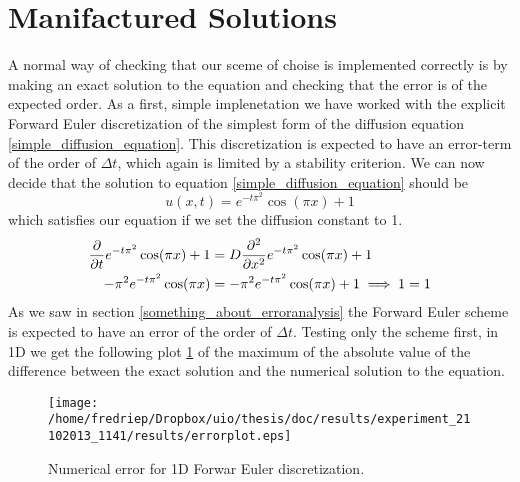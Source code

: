 \section{Manifactured Solutions}
A normal way of checking that our sceme of choise is implemented correctly is by making an exact solution to the equation and checking that the error is of the expected order. 
As a first, simple implenetation we have worked with the explicit Forward Euler discretization of the simplest form of the diffusion equation \hyperref[simple_diffusion_equation]{\ref*{simple_diffusion_equation}}. 
This discretization is expected to have an error-term of the order of $\Delta t$, which again is limited by a stability criterion. 
We can now decide that the solution to equation \ref{simple_diffusion_equation} should be
\begin{equation}\label{manifactured_solution_1D}
 u(x,t) = e^{-t\pi^2}\cos(\pi x) +1
\end{equation}
which satisfies our equation if we set the diffusion constant to 1.
\begin{align}
 \frac{\partial }{\partial t}e^{-t\pi^2}\cos(\pi x) +1 &= D\frac{\partial^2}{\partial x^2}e^{-t\pi^2}\cos(\pi x) +1\\
 -\pi^2e^{-t\pi^2}\cos(\pi x) &= -\pi^2e^{-t\pi^2}\cos(\pi x) +1 \implies 1 = 1
\end{align}
As we saw in section \ref{something_about_erroranalysis} the Forward Euler scheme is expected to have an error of the order of $\Delta t$. 
Testing only the scheme first, in 1D we get the following plot \ref{errorplot_FE1D_noWalk} of the maximum of the absolute value of the difference between the exact solution and the numerical solution to the equation. 

\begin{figure}[H]
\centering
\texttt{[image: /home/fredriep/Dropbox/uio/thesis/doc/results/experiment\_21102013\_1141/results/errorplot.eps]}
\caption{Numerical error for 1D Forwar Euler discretization.}
\label{errorplot_FE1D_noWalk}
\end{figure}

